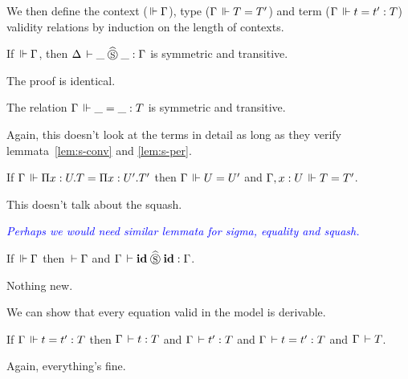 \documentclass[a4paper,english]{lipics-utf8x}
\newcommand\meta[1]{\noindent\textcolor{blue}{\emph{#1}}}
\begin{document}
  We then define the context ($\,\Vdash \Gamma$), type ($\Gamma \,\Vdash T = T'$) and
  term ($\Gamma \,\Vdash t = t' : T$) validity relations by induction on the length
  of contexts.

  \begin{mathc}
    \ru{}{\Der \cdot}
    \qquad
    \qquad
    \qquad
  \end{mathc}

  \begin{mathc}
    \qquad
  \end{mathc}

  \begin{lemma}
    If $\,\Vdash \Gamma$, then $\Delta \,\vdash \_ \mathrel{\widehat{\mathrel{\circledS}}} \_ : \Gamma$ is symmetric and
    transitive.
  \end{lemma}
  The proof is identical.

  \begin{lemma}
    The relation $\Gamma \,\Vdash \_ = \_ : T$ is symmetric and transitive.
  \end{lemma}
  Again, this doesn't look at the terms in detail as long as they verify
  lemmata~\ref{lem:s-conv} and \ref{lem:s-per}.

  \begin{lemma}
    \label{lem:fun-inj-valid}
    If $\Gamma \,\Vdash \Pi x:U.T = \Pi x:U'.T'$ then $\Gamma \,\Vdash U = U'$ and
    $\Gamma, x:U \,\Vdash T = T'$.
  \end{lemma}
  This doesn't talk about the squash.

  \meta{Perhaps we would need similar lemmata for sigma, equality and squash.}

  \begin{lemma}
    If $\,\Vdash \Gamma$ then $\,\vdash \Gamma$ and $\Gamma \,\vdash \operatorname{\mathbf{id}} \mathrel{\widehat{\mathrel{\circledS}}} \operatorname{\mathbf{id}} : \Gamma$.
  \end{lemma}
  Nothing new.

  We can show that every equation valid in the model is derivable.
  \begin{lemma}
    If $\Gamma \,\Vdash t = t' : T$ then $\Gamma \,\vdash t : T$ and
    $\Gamma \,\vdash t' : T$ and $\Gamma \,\vdash t = t' : T$ and $\Gamma \,\vdash T$.
  \end{lemma}
  Again, everything's fine.
\end{document}
